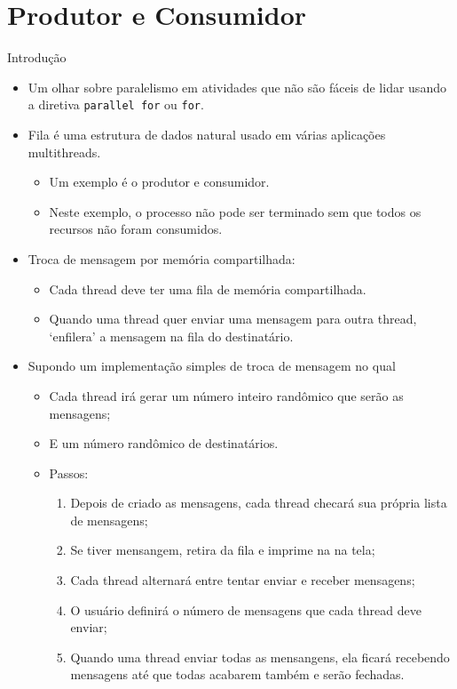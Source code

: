 \section{Produtor e Consumidor}
	\begin{frame}{Introdução}
		\begin{itemize}
			\item Um olhar sobre paralelismo em atividades que não são fáceis de lidar usando a diretiva {\tt parallel for} ou {\tt for}.
			\bigskip
			\item Fila é uma estrutura de dados natural usado em várias aplicações multithreads.
			\begin{itemize}
				\item Um exemplo é o produtor e consumidor.
				\item Neste exemplo, o processo não pode ser terminado sem que todos os recursos não foram consumidos.
			\end{itemize}
			\item Troca de mensagem por memória compartilhada:
			\begin{itemize}
				\item Cada thread deve ter uma fila de memória compartilhada.
				\item Quando uma thread quer enviar uma mensagem para outra thread, `enfilera' a mensagem na fila do destinatário.
			\end{itemize}
			\item Supondo um implementação simples de troca de mensagem no qual
			\begin{itemize}
				\item Cada thread irá gerar um número inteiro randômico que serão as mensagens;
				\item E um número randômico de destinatários.
				\item Passos:
				\begin{enumerate}
					\item Depois de criado as mensagens, cada thread checará sua própria lista de mensagens;
					\item Se tiver mensangem, retira da fila e imprime na na tela;
					\item Cada thread alternará entre tentar enviar e receber mensagens;
					\item O usuário definirá o número de mensagens que cada thread deve enviar;
					\item Quando uma thread enviar todas as mensangens, ela ficará recebendo mensagens até que todas acabarem também e serão fechadas.
				\end{enumerate}
			\end{itemize}
		\end{itemize}
	\end{frame}

